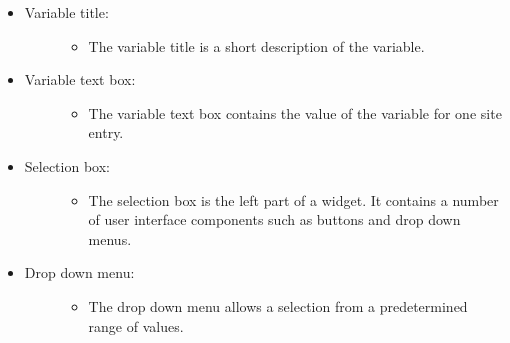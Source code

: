 \documentclass[letterpaper,10pt,english]{sphinxmanual}
\begin{document}
\begin{itemize}
\begin{description}
\begin{itemize}
\begin{description}
\begin{itemize}
\end{itemize}

\end{description}

\item {} \begin{description}
\item[{Variable title:}] \leavevmode\begin{itemize}
\item {} 
The variable title is a short description of the variable.

\end{itemize}

\end{description}

\item {} \begin{description}
\item[{Variable text box:}] \leavevmode\begin{itemize}
\item {} 
The variable text box contains the value of the variable for one site entry.

\end{itemize}

\end{description}

\item {} \begin{description}
\item[{Selection box:}] \leavevmode\begin{itemize}
\item {} 
The selection box is the left part of a widget. It contains a number of user interface components such as buttons and drop down menus.

\end{itemize}

\end{description}

\item {} \begin{description}
\item[{Drop down menu:}] \leavevmode\begin{itemize}
\item {} 
The drop down menu allows a selection from a predetermined range of values.

\end{itemize}

\end{description}


\end{itemize}
\end{description}
\end{itemize}
\end{document}
